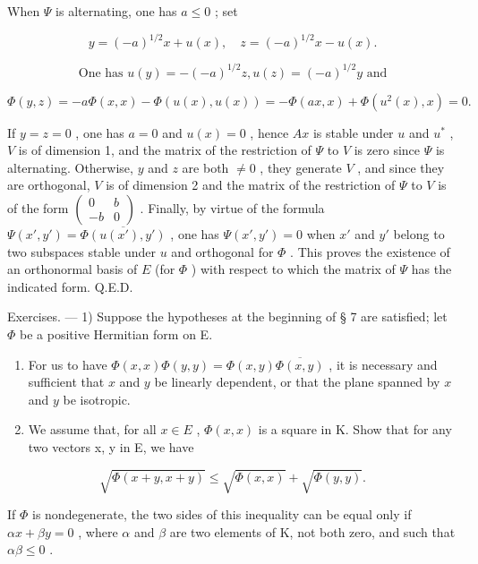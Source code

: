 When \(\Psi\) is alternating, one has \(a \leqslant 0\) ; set

\[
y = (- a) ^ {1 / 2} x + u (x), \quad z = (- a) ^ {1 / 2} x - u (x).
\]

\[
\text { One has } u (y) = - (- a) ^ {1 / 2} z, u (z) = (- a) ^ {1 / 2} y \text { and }
\]

\[
\Phi (y, z) = - a \Phi (x, x) - \Phi (u (x), u (x)) = - \Phi (a x, x) + \Phi (u ^ {2} (x), x) = 0.
\]

If \(y = z = 0\) , one has \(a = 0\) and \(u(x) = 0\) , hence \(Ax\) is stable under \(u\) and \(u^{*}\) , \(V\) is of dimension 1, and the matrix of the restriction of \(\Psi\) to \(V\) is zero since \(\Psi\) is alternating. Otherwise, \(y\) and \(z\) are both \(\neq 0\) , they generate \(V\) , and since they are orthogonal, \(V\) is of dimension 2 and the matrix of the restriction of \(\Psi\) to \(V\) is of the form \(\begin{pmatrix} 0 & b \\ -b & 0 \end{pmatrix}\) . Finally, by virtue of the formula \(\Psi(x', y') = \overline{\Phi(u(x'), y')}\) , one has \(\Psi(x', y') = 0\) when \(x'\) and \(y'\) belong to two subspaces stable under \(u\) and orthogonal for \(\Phi\) . This proves the existence of an orthonormal basis of \(E\) (for \(\Phi\) ) with respect to which the matrix of \(\Psi\) has the indicated form. Q.E.D.

Exercises. --- 1) Suppose the hypotheses at the beginning of § 7 are satisfied; let \(\Phi\) be a positive Hermitian form on E.

\begin{enumerate}
\def\labelenumi{\alph{enumi})}
\item
  For us to have \(\Phi(x,x)\Phi(y,y)=\Phi(x,y)\overline{\Phi(x,y)}\) , it is necessary and sufficient that \(x\) and \(y\) be linearly dependent, or that the plane spanned by \(x\) and \(y\) be isotropic.
\item
  We assume that, for all \(x \in E\) , \(\Phi(x, x)\) is a square in K. Show that for any two vectors x, y in E, we have
\end{enumerate}

\[
\sqrt {\Phi (x + y , x + y)} \leqslant \sqrt {\Phi (x , x)} + \sqrt {\Phi (y , y)}.
\]

If \(\Phi\) is nondegenerate, the two sides of this inequality can be equal only if \(\alpha x + \beta y = 0\) , where \(\alpha\) and \(\beta\) are two elements of K, not both zero, and such that \(\alpha \beta \leqslant 0\) .

